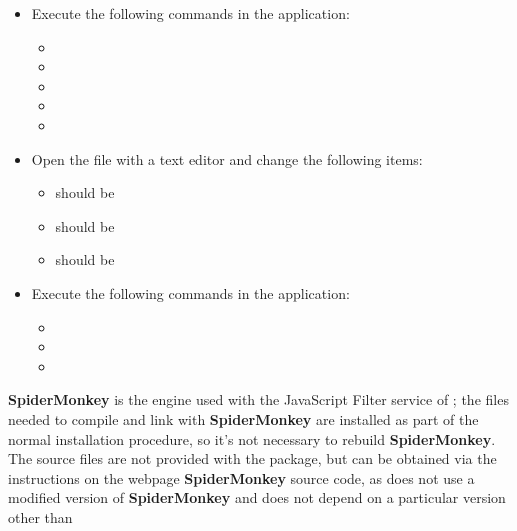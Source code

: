 \tertiaryEnd
{}
\begin{itemize}
\item Execute the following commands in the  application:
\begin{itemize}
\item {}
\item\exSp{}
\item\exSp{}
\item\exSp{}
\item\exSp{}
\end{itemize}
\item\exSp{}Open the file  with a text editor and change the
following items:
\begin{itemize}
\item {} should be 
\item\exSp{} should be 
\item\exSp{} should be 
\end{itemize}
\item\exSp{}Execute the following commands in the  application:
\begin{itemize}
\item {}
\item\exSp{}
\item\exSp{}
\end{itemize}
\end{itemize}
\tertiaryEnd
\secondaryEnd
{}
\textbf{SpiderMonkey} is the  engine used with the JavaScript Filter
service of \mplusm{}; the files needed to compile and link with \textbf{SpiderMonkey} are
installed as part of the normal \mplusm{} installation procedure, so it's not necessary to
rebuild \textbf{SpiderMonkey}.
The source files are not provided with the  package, but can be obtained
via the instructions on the web\longDash{}page
%
{\textbf{SpiderMonkey} source code}, as \mplusm{} does not use a modified version of
\textbf{SpiderMonkey} and does not depend on a particular version \longDash{} other than
